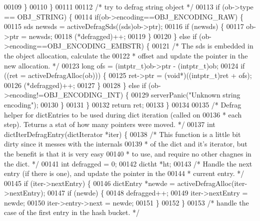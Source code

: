 \begin{DoxyCode}
00109         \}
00110     \}
00111 
00112     \textcolor{comment}{/* try to defrag string object */}
00113     \textcolor{keywordflow}{if} (ob->type == OBJ\_STRING) \{
00114         \textcolor{keywordflow}{if}(ob->encoding==OBJ\_ENCODING\_RAW) \{
00115             sds newsds = activeDefragSds((sds)ob->ptr);
00116             \textcolor{keywordflow}{if} (newsds) \{
00117                 ob->ptr = newsds;
00118                 (*defragged)++;
00119             \}
00120         \} \textcolor{keywordflow}{else} \textcolor{keywordflow}{if} (ob->encoding==OBJ\_ENCODING\_EMBSTR) \{
00121             \textcolor{comment}{/* The sds is embedded in the object allocation, calculate the}
00122 \textcolor{comment}{             * offset and update the pointer in the new allocation. */}
00123             \textcolor{keywordtype}{long} ofs = (intptr\_t)ob->ptr - (intptr\_t)ob;
00124             \textcolor{keywordflow}{if} ((ret = activeDefragAlloc(ob))) \{
00125                 ret->ptr = (\textcolor{keywordtype}{void}*)((intptr\_t)ret + ofs);
00126                 (*defragged)++;
00127             \}
00128         \} \textcolor{keywordflow}{else} \textcolor{keywordflow}{if} (ob->encoding!=OBJ\_ENCODING\_INT) \{
00129             serverPanic(\textcolor{stringliteral}{"Unknown string encoding"});
00130         \}
00131     \}
00132     \textcolor{keywordflow}{return} ret;
00133 \}
00134 
00135 \textcolor{comment}{/* Defrag helper for dictEntries to be used during dict iteration (called on}
00136 \textcolor{comment}{ * each step). Teturns a stat of how many pointers were moved. */}
00137 \textcolor{keywordtype}{int} dictIterDefragEntry(dictIterator *iter) \{
00138     \textcolor{comment}{/* This function is a little bit dirty since it messes with the internals}
00139 \textcolor{comment}{     * of the dict and it's iterator, but the benefit is that it is very easy}
00140 \textcolor{comment}{     * to use, and require no other chagnes in the dict. */}
00141     \textcolor{keywordtype}{int} defragged = 0;
00142     dictht *ht;
00143     \textcolor{comment}{/* Handle the next entry (if there is one), and update the pointer in the}
00144 \textcolor{comment}{     * current entry. */}
00145     \textcolor{keywordflow}{if} (iter->nextEntry) \{
00146         dictEntry *newde = activeDefragAlloc(iter->nextEntry);
00147         \textcolor{keywordflow}{if} (newde) \{
00148             defragged++;
00149             iter->nextEntry = newde;
00150             iter->entry->next = newde;
00151         \}
00152     \}
00153     \textcolor{comment}{/* handle the case of the first entry in the hash bucket. */}

\end{DoxyCode}
